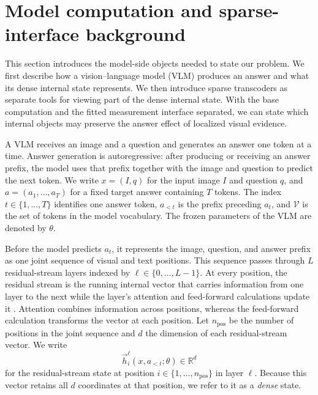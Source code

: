 \section{Model computation and sparse-interface background}
\label{app:model-background}

This section introduces the model-side objects needed to state our problem. We first describe how a vision--language model (VLM) produces an answer and what its dense internal state represents. We then introduce sparse transcoders as separate tools for viewing part of the dense internal state. With the base computation and the fitted measurement interface separated, we can state which internal objects may preserve the answer effect of localized visual evidence.

A VLM receives an image and a question and generates an answer one token at a time. Answer generation is autoregressive: after producing or receiving an answer prefix, the model uses that prefix together with the image and question to predict the next token. We write $x=(I,q)$ for the input image $I$ and question $q$, and $a=(a_1,\ldots,a_T)$ for a fixed target answer containing $T$ tokens. The index $t\in\{1,\ldots,T\}$ identifies one answer token, $a_{<t}$ is the prefix preceding $a_t$, and $\mathcal{V}$ is the set of tokens in the model vocabulary. The frozen parameters of the VLM are denoted by $\theta$.

Before the model predicts $a_t$, it represents the image, question, and answer prefix as one joint sequence of visual and text positions. This sequence passes through $L$ residual-stream layers indexed by $\ell\in\{0,\ldots,L-1\}$. At every position, the residual stream is the running internal vector that carries information from one layer to the next while the layer's attention and feed-forward calculations update it \citep{elhage2021transformerCircuits}. Attention combines information across positions, whereas the feed-forward calculation transforms the vector at each position. Let $n_{\mathrm{pos}}$ be the number of positions in the joint sequence and $d$ the dimension of each residual-stream vector. We write
\begin{equation}
    \vec{h}_{i}^{\ell}(x,a_{<t};\theta)\in\mathbb{R}^{d}
    \label{eq:dense-state}
\end{equation}
for the residual-stream state at position $i\in\{1,\ldots,n_{\mathrm{pos}}\}$ in layer $\ell$. Because this vector retains all $d$ coordinates at that position, we refer to it as a \emph{dense} state.

